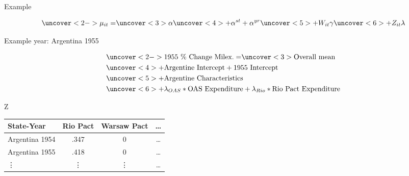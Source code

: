 \documentclass[12pt]{beamer}
\begin{document}

\begin{frame}{Example}


\begin{equation*}
\uncover<2->{\mu_{it} =} \uncover<3>{\alpha} \uncover<4>{+ \alpha^{st} + \alpha^{yr}} \uncover<5>{+ W_{it} \gamma} \uncover<6>{+ Z_{it} \lambda}
\end{equation*}

Example year: Argentina 1955

\begin{equation*}
\begin{split}
& \uncover<2->{\mbox{1955 \% Change Milex.} = } \uncover<3>{\mbox{Overall mean}} \\
& \uncover<4>{+ \mbox{Argentine Intercept} + \mbox{1955 Intercept}} \\
& \uncover<5>{+ \mbox{Argentine Characteristics}} \\
& \uncover<6>{+ \lambda_{OAS} * \mbox{OAS Expenditure} + \lambda_{Rio} * \mbox{Rio Pact Expenditure}}
\end{split}
\end{equation*}



\end{frame}






\begin{frame}[standout]{Z} 

\begin{tabular}{lccc}
State-Year & Rio Pact & Warsaw Pact & \ldots \\
\hline
Argentina 1954 & .347 & 0 & \ldots \\
Argentina 1955 & .418  & 0 & \ldots  \\
 \vdots & \vdots & \vdots & \ldots  
\end{tabular}

 \end{frame}



\end{document}
